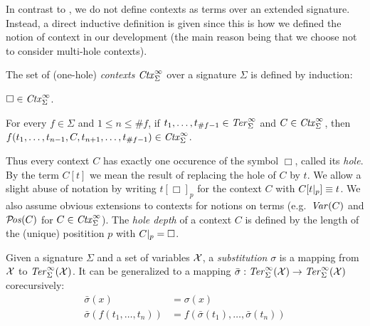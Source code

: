 In contrast to \cite{terese-03}, we do not define contexts as terms over an
extended signature. Instead, a direct inductive definition is given since this
is how we defined the notion of context in our \Coq development (the main
reason being that we choose not to consider multi-hole contexts).

\begin{definition}%
The set of (one-hole) \emph{contexts} $\mathit{Ctx}_\Sigma^\infty$ over a signature
$\Sigma$ is defined by induction:
\begin{compactenum}
  \item
    $\Box \in \mathit{Ctx}_\Sigma^\infty$.
  \item
    For every $f \in \Sigma$ and $1 \le n \le \#f$, if $t_1, \ldots, t_{\#f -
      1} \in \mathit{Ter}_\Sigma^\infty$ and $C \in \mathit{Ctx}_\Sigma^\infty$, then $f(t_1, \ldots, t_{n - 1},
    C, t_{n + 1}, \ldots, t_{\#f - 1}) \in \mathit{Ctx}_\Sigma^\infty$.
\end{compactenum}
\end{definition}

Thus every context $C$ has exactly one occurence of the symbol $\Box$, called
its \emph{hole}. By the term $C[t]$ we mean the result of replacing the hole
of $C$ by $t$. We allow a slight abuse of notation by writing
$t[\Box]_p$ for the context $C$ with $C[t |_{p}] \equiv t$. We
also assume obvious extensions to contexts for notions on terms
(e.g.\ $\mathit{Var}(C)$ and $\mathcal{P}\!\mathit{os}(C)$ for $C \in \mathit{Ctx}_\Sigma^\infty$).
The \emph{hole depth} of a context $C$ is defined by the length of the
(unique) positition $p$ with $C |_{p} = \Box$.


\begin{definition}%
Given a signature $\Sigma$ and a set of variables $\mathcal{X}$, a
\emph{substitution} $\sigma$ is a mapping from $\mathcal{X}$ to $\mathit{Ter}_\Sigma^\infty(\mathcal{X})$. It
can be generalized to a mapping $\bar{\sigma} : \mathit{Ter}_\Sigma^\infty(\mathcal{X}) \rightarrow
\mathit{Ter}_\Sigma^\infty(\mathcal{X})$ corecursively:
\begin{align*}
  \bar{\sigma}(x) &= \sigma(x)\\
  \bar{\sigma}(f(t_1, \ldots, t_n)) &= f(\bar{\sigma}(t_1), \ldots,
  \bar{\sigma}(t_n))
\end{align*}
\end{definition}

